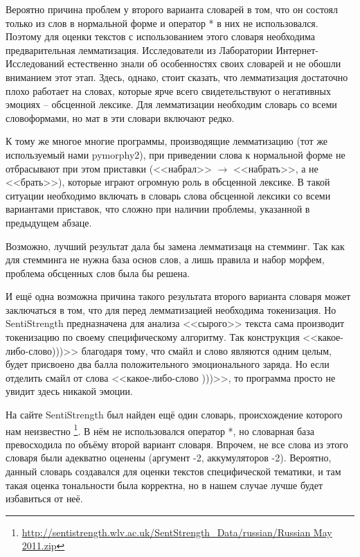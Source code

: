 Вероятно причина проблем у второго варианта словарей в том, что он состоял только из слов в нормальной форме и оператор * в них не использовался. Поэтому для оценки текстов с использованием этого словаря необходима предварительная лемматизация. Исследователи из Лаборатории Интернет-Исследований естественно знали об особенностях своих словарей и не обошли вниманием этот этап. Здесь, однако, стоит сказать, что лемматизация достаточно плохо работает на словах, которые ярче всего свидетельствуют о негативных эмоциях -- обсценной лексике. Для лемматизации необходим словарь со всеми словоформами, но мат в эти словари включают редко.

К тому же многое многие программы, производящие лемматизацию (тот же используемый нами pymorphy2), при приведении слова к нормальной форме не отбрасывают при этом приставки (<<набрал>> $\rightarrow$ <<набрать>>, а не <<брать>>), которые играют огромную роль в обсценной лексике. В такой ситуации необходимо включать в словарь слова обсценной лексики со всеми вариантами приставок, что сложно при наличии проблемы, указанной в предыдущем абзаце.

Возможно, лучший результат дала бы замена лемматизаця на стемминг. Так как для стемминга не нужна база основ слов, а лишь правила и набор морфем, проблема обсценных слов была бы решена.

И ещё одна возможна причина такого результата второго варианта словаря может заключаться в том, что для перед лемматизацией  необходима токенизация. Но SentiStrength предназначена для анализа <<сырого>> текста сама производит токенизацию по своему специфическому алгоритму. Так конструкция <<какое-либо-слово)))>> благодаря тому, что смайл и слово являются одним целым, будет присвоено два балла положительного эмоционального заряда. Но если отделить смайл от слова <<какое-либо-слово )))>>, то программа просто не увидит здесь никакой эмоции.

На сайте SentiStrength был найден ещё один словарь, происхождение которого нам неизвестно \footnote{\href{http://sentistrength.wlv.ac.uk/SentStrength\_Data/russian/Russian\%20May\%202011.zip}{http://sentistrength.wlv.ac.uk/SentStrength\_Data/russian/Russian May 2011.zip}}. В нём не использовался оператор *, но словарная база превосходила по объёму второй вариант словаря. Впрочем, не все слова из этого словаря были адекватно оценены (аргумент -2, аккумуляторов -2). Вероятно, данный словарь создавался для оценки текстов специфической тематики, и там такая оценка тональности была корректна, но в нашем случае лучше будет избавиться от неё.

